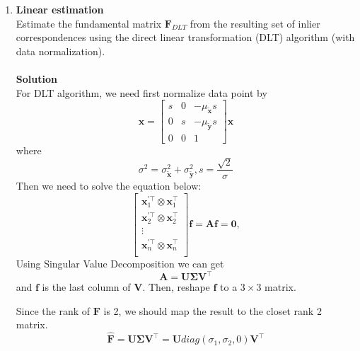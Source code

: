 \documentclass{../../assignment}
\begin{document}
\begin{problemlist}
\begin{enumerate}
\item \textbf{Linear estimation}\\
Estimate the fundamental matrix $\mathbf{F}_{DLT}$ from the resulting set of inlier correspondences using the direct linear transformation (DLT) algorithm (with data normalization).
\\\\
\textbf{Solution}\\
For DLT algorithm, we need first normalize data point by
$$
\mathbf{x}=
\begin{bmatrix}
s & 0 & -\mu_{\tilde{\mathbf{x}}}s\\
0 & s & -\mu_{\tilde{\mathbf{y}}}s\\
0 & 0 & 1
\end{bmatrix}\mathbf{x}
$$
where
$$
\sigma^2 = \sigma_{\tilde{\mathbf{x}}}^2 + \sigma_{\tilde{\mathbf{y}}}^2,
s = \frac{\sqrt{2}}{\sigma}
$$
Then we need to solve the equation below:
\[
\begin{bmatrix}
\mathbf{x}_1^{'\top} \otimes \mathbf{x}_1^{\top}\\
\mathbf{x}_2^{'\top} \otimes \mathbf{x}_2^{\top}\\
\vdots \\
\mathbf{x}_n^{'\top} \otimes \mathbf{x}_n^{\top}\\
\end{bmatrix}\mathbf{f}= \mathbf{A}\mathbf{f}=\mathbf{0},
\]
Using Singular Value Decomposition we can get
$$\mathbf{A} = \mathbf{U}\mathbf{\Sigma}\mathbf{V}^{\top}$$
and $\mathbf{f}$ is the last column of $\mathbf{V}$. Then, reshape $\mathbf{f}$ to a $3\times 3$ matrix.

Since the rank of $\mathbf{F}$ is 2, we should map the result to the closet rank 2 matrix.
$$\hat{\mathbf{F}} = \mathbf{U\Sigma V}^{\top} = \mathbf{U}diag(\sigma_1,\sigma_2,0)\mathbf{V}^{\top}$$


\end{enumerate}
\end{problemlist}
\end{document}
